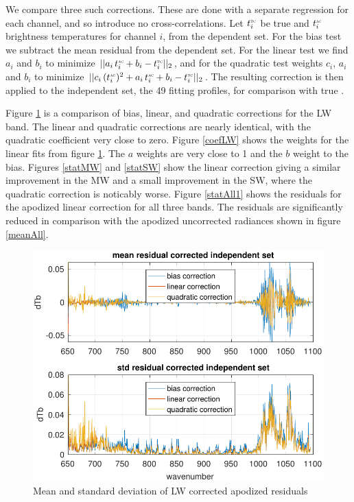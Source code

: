 \documentclass[10pt,twocolumn]{article}
\begin{document}
We compare three such corrections.  These are done with a separate
regression for each {\cris} channel, and so introduce no
cross-correlations.  Let $t^{\mbox{\tiny\textsc{tc}}}_i$ be true {\cris} and $t^{\mbox{\tiny\textsc{ac}}}_i$
{\airs} {\cris} brightness temperatures for {\cris} channel $i$,
from the dependent set.  For the bias test we subtract the mean
residual from the dependent set.  For the linear test we find $a_i$
and $b_i$ to minimize $||a_i\,t^{\mbox{\tiny\textsc{ac}}}_i + b_i - t^{\mbox{\tiny\textsc{tc}}}_i||_2$, and for
the quadratic test weights $c_i$, $a_i$ and $b_i$ to minimize
$||c_i\,(t^{\mbox{\tiny\textsc{ac}}}_i)^2 + a_i\,t^{\mbox{\tiny\textsc{ac}}}_i + b_i - t^{\mbox{\tiny\textsc{tc}}}_i||_2$.  The resulting
correction is then applied to the independent set, the 49 fitting
profiles, for comparison with true {\cris}.

Figure \ref{statLW} is a comparison of bias, linear, and quadratic
corrections for the LW band.  The linear and quadratic corrections
are nearly identical, with the quadratic coefficient very close to
zero.  Figure \ref{coefLW} shows the weights for the linear fits
from figure \ref{statLW}.  The $a$ weights are very close to 1 and
the $b$ weight to the bias.  Figures \ref{statMW} and \ref{statSW}
show the linear correction giving a similar improvement in the MW
and a small improvement in the SW, where the quadratic correction is
noticably worse.  Figure \ref{statAll1} shows the residuals for the
apodized linear correction for all three bands.  The residuals are
significantly reduced in comparison with the apodized uncorrected
radiances shown in figure \ref{meanAll}.

\begin{figure} %
  \centering
  \includegraphics[width=\linewidth]{figures/a2cris_regr_LW.pdf}
  \caption{Mean and standard deviation of LW corrected apodized
    residuals}
  \label{statLW}
\end{figure}
\end{document}
